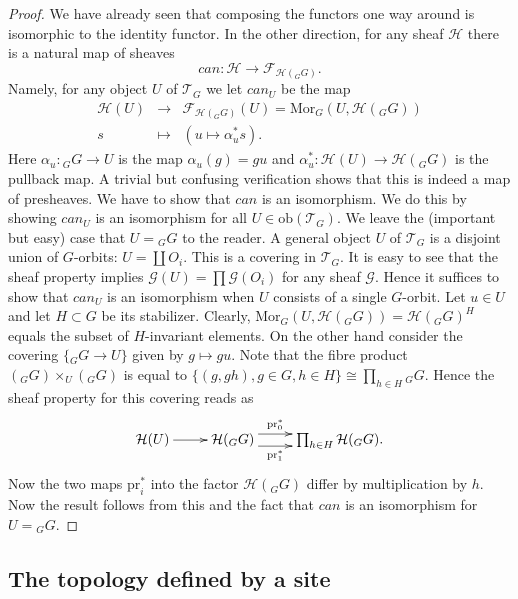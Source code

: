 \begin{proof}
We have already seen that composing the functors one way around
is isomorphic to the identity functor.
In the other direction, for any sheaf $\mathcal{H}$ there is a natural 
map of sheaves
$$
can :
\mathcal{H}
\longrightarrow
\mathcal{F}_{\mathcal{H}({}_GG)}.
$$
Namely, for any object $U$ of $\mathcal{T}_G$ we let $can_U$
be the map
$$
\begin{matrix}
\mathcal{H}(U)
&
\longrightarrow
&
\mathcal{F}_{\mathcal{H}({}_GG)}(U)
=
\text{Mor}_G(U, \mathcal{H}({}_GG))
\\
s 
&
\longmapsto
&
(u \mapsto \alpha_u^*s).
\end{matrix}
$$
Here $\alpha_u : {}_GG \to U$ is the map
$\alpha_u(g) = gu$ and $\alpha_u^* : \mathcal{H}(U)
\to \mathcal{H}({}_GG)$ is the pullback map. A trivial
but confusing verification shows that this is indeed a map
of presheaves. We have to show that $can$ is an isomorphism.
We do this by showing $can_U$ is an isomorphism for all $U
\in \text{ob}(\mathcal{T}_G)$. We leave the (important but
easy) case that $U = {}_GG$ to the reader.
A general object $U$ of $\mathcal{T}_G$ is a disjoint union of
$G$-orbits: $U = \coprod O_i$. This is a covering in
$\mathcal{T}_G$. It is easy to see that the sheaf property
implies $\mathcal{G}(U) = \prod \mathcal{G}(O_i)$ for any sheaf
$\mathcal{G}$. Hence it suffices to show that $can_U$ is an
isomorphism when $U$ consists of a single $G$-orbit. Let $u \in U$
and let $H \subset G$ be its stabilizer. Clearly,
$\text{Mor}_G(U, \mathcal{H}({}_GG)) = \mathcal{H}({}_GG)^H$
equals the subset of $H$-invariant elements. On the other hand
consider the covering $\{{}_GG \to U\}$ given by $g \mapsto
gu$. Note that the fibre product $({}_GG)\times_U ({}_GG)$
is equal to $\{(g, gh), g\in G, h\in H\} \cong \prod_{h\in H}
{}_GG$. Hence the sheaf property for this covering reads
as 
$$
\xymatrix{
\mathcal{H}(U) \ar[r]
&
\mathcal{H}({}_GG)
\ar@<1ex>[r]^-{\text{pr}_0^*} \ar@<-1ex>[r]_-{\text{pr}_1^*}
&
\prod_{h \in H}
\mathcal{H}({}_GG).
}
$$
Now the two maps $\text{pr}_i^*$ into the factor
$\mathcal{H}({}_GG)$ differ by multiplication by $h$.
Now the result follows from this and the fact that $can$
is an isomorphism for $U={}_GG$.
\end{proof}

\subsection{The topology defined by a site}
\label{subsection-topology-site}

